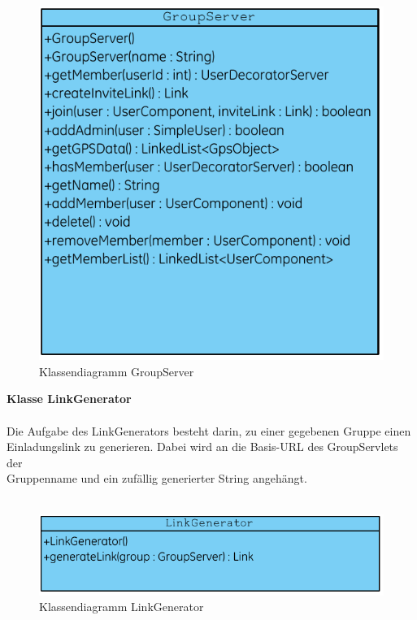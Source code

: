 \\
\begin{figure}[h]
     \centering
     \includegraphics[scale=1.0, trim=2 2 2 2, clip=true]{servergraphs/group-server.pdf}
     \caption{Klassendiagramm GroupServer}
\end{figure}
\clearpage

\textbf{Klasse LinkGenerator}\\
\\
Die Aufgabe des LinkGenerators besteht darin, zu einer gegebenen Gruppe einen \\
Einladungslink zu generieren. Dabei wird an die Basis-URL des GroupServlets der\\
Gruppenname und ein zufällig generierter String angehängt.\\

\\
\begin{figure}[h]
     \centering
     \includegraphics[scale=1.0, trim=2 2 2 2, clip=true]{servergraphs/link-generator.pdf}
     \caption{Klassendiagramm LinkGenerator}
\end{figure}
\clearpage

